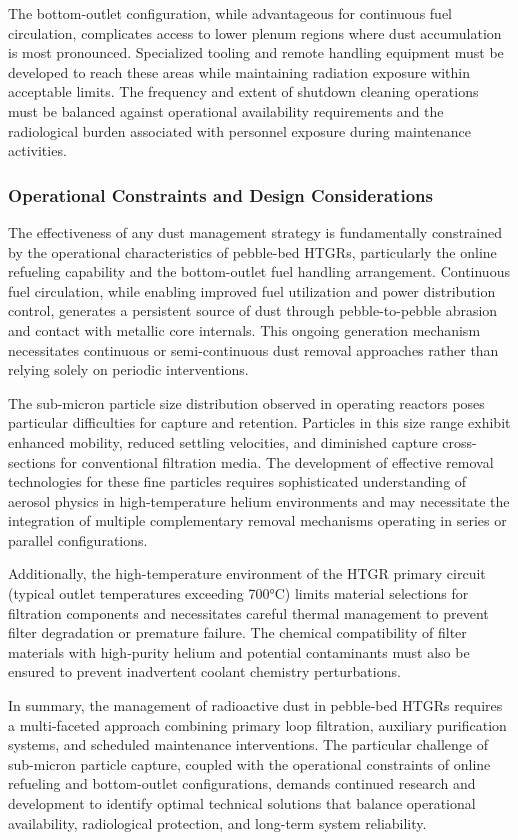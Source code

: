\documentclass[12pt,a4paper]{article}
\begin{document}
The bottom-outlet configuration, while advantageous for continuous fuel circulation, complicates access to lower plenum regions where dust accumulation is most pronounced. Specialized tooling and remote handling equipment must be developed to reach these areas while maintaining radiation exposure within acceptable limits. The frequency and extent of shutdown cleaning operations must be balanced against operational availability requirements and the radiological burden associated with personnel exposure during maintenance activities.

\subsubsection{Operational Constraints and Design Considerations}

The effectiveness of any dust management strategy is fundamentally constrained by the operational characteristics of pebble-bed HTGRs, particularly the online refueling capability and the bottom-outlet fuel handling arrangement. Continuous fuel circulation, while enabling improved fuel utilization and power distribution control, generates a persistent source of dust through pebble-to-pebble abrasion and contact with metallic core internals. This ongoing generation mechanism necessitates continuous or semi-continuous dust removal approaches rather than relying solely on periodic interventions.

The sub-micron particle size distribution observed in operating reactors \cite{Xie2017HTR10Dust} poses particular difficulties for capture and retention. Particles in this size range exhibit enhanced mobility, reduced settling velocities, and diminished capture cross-sections for conventional filtration media. The development of effective removal technologies for these fine particles requires sophisticated understanding of aerosol physics in high-temperature helium environments and may necessitate the integration of multiple complementary removal mechanisms operating in series or parallel configurations.

Additionally, the high-temperature environment of the HTGR primary circuit (typical outlet temperatures exceeding 700°C) limits material selections for filtration components and necessitates careful thermal management to prevent filter degradation or premature failure. The chemical compatibility of filter materials with high-purity helium and potential contaminants must also be ensured to prevent inadvertent coolant chemistry perturbations.

In summary, the management of radioactive dust in pebble-bed HTGRs requires a multi-faceted approach combining primary loop filtration, auxiliary purification systems, and scheduled maintenance interventions. The particular challenge of sub-micron particle capture, coupled with the operational constraints of online refueling and bottom-outlet configurations, demands continued research and development to identify optimal technical solutions that balance operational availability, radiological protection, and long-term system reliability.



\end{document}
